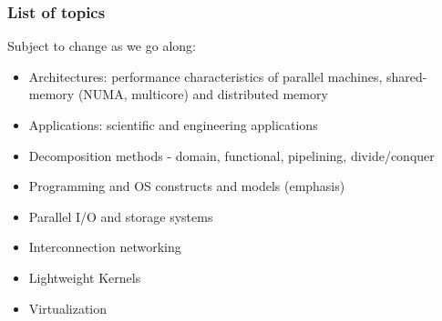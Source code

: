 \documentclass{beamer}
\begin{document}
\begin{frame}
\frametitle{List of topics}

Subject to change as we go along:
\begin{itemize}
\item Architectures: performance characteristics of parallel machines,
  shared-memory (NUMA, multicore) and distributed memory
\item Applications: scientific and engineering applications
\item Decomposition methods - domain, functional, pipelining,
  divide/conquer
\item Programming and OS constructs and models (emphasis)
\item Parallel I/O and storage systems
\item Interconnection networking
\item Lightweight Kernels
\item Virtualization
\end{itemize}

\end{frame}
\end{document}
